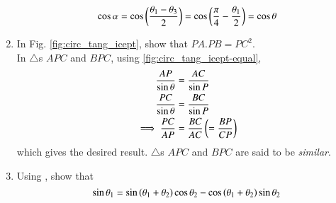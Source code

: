 \begin{enumerate}[label=\thesection.\arabic*.,ref=\thesection.\theenumi]
\begin{align}
	  \cos \alpha = \cos \left(\frac{\theta_1-\theta_3}{2}  \right)
	    =\cos\left(\frac{\pi}{4}-\frac{\theta_1}{2}\right)
	  =\cos \theta
  \end{align}
%
\item
	In Fig. \ref{fig:circ_tang_icept}, show that $PA.PB = PC^2$.
\label{them:circ_tang_icept_prod}	
\\
\solution 
In $\triangle$s $APC$ and $BPC$, 
using
		\eqref{fig:circ_tang_icept-equal},	
  \begin{align}
	  \frac{AP}{\sin \theta} &= \frac{AC}{\sin P} 
	  \\
	  \frac{PC}{\sin \theta} &= \frac{BC}{\sin P} 
	  \\
	  \implies \frac{PC}{AP} &= \frac{BC}{AC}  \left(= \frac{BP}{CP}\right)
  \end{align}
  which gives the desired result.
$\triangle$s $APC$ and $BPC$ are said to be {\em similar}.
%
\item
	Using 
	,
show that 
\begin{equation}
\label{trig_id_sin_theta_eq}
\sin  \theta_1 = \sin \left(\theta_1 + \theta_2\right)\cos \theta_2 - \cos\left(\theta_1+\theta_2\right)\sin\theta_2
\end{equation}	
\iffalse
\begin{figure}[!ht]
	\begin{center}
		
		\resizebox{0.6\columnwidth}{!}{}
	\end{center}
	\caption{$\sin \brak{\theta_1+\theta_2} = \sin\theta_1\cos\theta_2 + \cos\theta_1\sin\theta_2$}
	\label{trig_id_sin_theta}	
\end{figure}
\fi
%


\end{enumerate}
